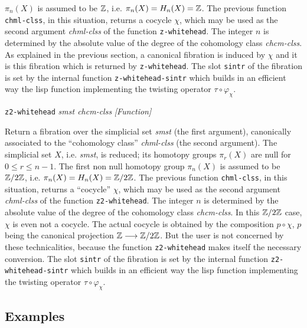 {{$\pi_n(X)$ is assumed to be ${{\Bbb Z}}$, i.e. $\pi_n(X)= H_n(X)= {{\Bbb Z}}$. The previous function {\tt chml-clss}, in
this situation, returns a cocycle $\chi$, which may be used as the second argument {\em chml-clss} of the function
{\tt z-whitehead}. The integer  $n$ is determined by the absolute value of the degree of the
cohomology class {\em chcm-clss}. As explained in the previous section, a canonical fibration
is induced by $\chi$ and it is this fibration which is returned by {\tt z-whitehead}. The slot {\tt sintr} of the
fibration is set by the internal function {\tt z-whitehead-sintr} which builds 
in an efficient way the lisp function implementing the twisting operator $\tau \circ \varphi_\chi$.
\par}
{\leftskip=5mm
{\tt z2-whitehead} {\em smst chcm-clss}  \hfill {\em [Function]} \par}
{\leftskip=15mm
Return a fibration  over the simplicial set {\em smst} (the first argument), canonically associated
to the ``cohomology class'' {\em chml-clss} (the second argument). The simplicial set $X$, i.e. {\em smst}, is 
reduced; its homotopy groups $\pi_r(X)$ are null for $0 \leq r \leq n-1$. The first non null homotopy group
$\pi_n(X)$ is assumed to be ${{\Bbb Z}}/2{{\Bbb Z}}$, i.e. $\pi_n(X)= H_n(X)= {{\Bbb Z}}/2{{\Bbb Z}}$. The previous function {\tt chml-clss}, in
this situation, returns a ``cocycle'' $\chi$, which may be used as the second argument {\em chml-clss} of the function
{\tt z2-whitehead}. The integer $n$ is determined by the absolute value of the degree of the
cohomology class {\em chcm-clss}. In this ${{\Bbb Z}}/2{{\Bbb Z}}$ case, $\chi$ is even not a cocycle. The actual cocycle is
obtained by the composition $p \circ \chi$, $p$ being the canonical projection 
${{\Bbb Z}} \longrightarrow {{\Bbb Z}}/{2 {{\Bbb Z}}}$. But the user is not concerned by these technicalities, because the function
{\tt z2-whitehead} makes itself the necessary conversion. The slot {\tt sintr} of the
fibration is set by the internal function {\tt z2-whitehead-sintr} which builds 
in an efficient way the lisp function implementing the twisting operator $\tau \circ \varphi_\chi$.
\par}
}

\subsection* {Examples}

